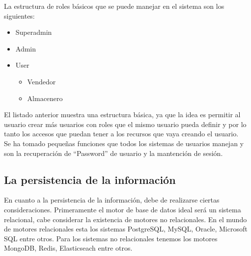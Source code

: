 La estructura de roles básicos que se puede manejar en el sistema son los siguientes:

\begin{itemize}
\item Superadmin
\item Admin
\item User
\begin{itemize}
\item Vendedor
\item Almacenero
\end{itemize}
\end{itemize}

El listado anterior muestra una estructura básica, ya que la idea es permitir al usuario crear más usuarios con roles que el mismo usuario pueda definir y por lo tanto los accesos que puedan tener a los recursos que vaya creando el usuario.\\

Se ha tomado pequeñas funciones que todos los sistemas de usuarios manejan y son la recuperación de “Password” de usuario y la mantención de sesión.

\subsection{La persistencia de la información}

En cuanto a la persistencia de la información, debe de realizarse ciertas consideraciones. Primeramente el motor de base de datos ideal será un sistema relacional, cabe considerar la existencia de motores no relacionales. En el mundo de motores relacionales esta los sistemas PostgreSQL, MySQL, Oracle, Microsoft SQL entre otros. Para los sistemas no relacionales tenemos los motores MongoDB, Redis, Elasticseach entre otros.


